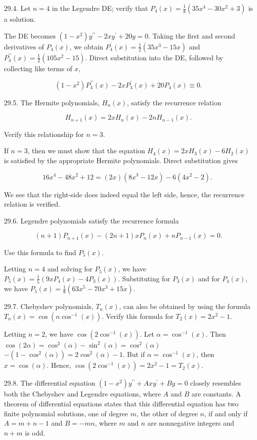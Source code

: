 \documentclass[10pt]{article}
\begin{document}
29.4. Let $n=4$ in the Legendre DE; verify that $P_{4}(x)=\frac{1}{8}\left(35 x^{4}-30 x^{2}+3\right)$ is a solution.

The DE becomes $\left(1-x^{2}\right) y^{\prime \prime}-2 x y^{\prime}+20 y=0$. Taking the first and second derivatives of $P_{4}(x)$, we obtain $P_{4}^{\prime}(x)=\frac{1}{2}\left(35 x^{3}-15 x\right)$ and $P_{4}^{\prime \prime}(x)=\frac{1}{2}\left(105 x^{2}-15\right)$. Direct substitution into the DE, followed by collecting like terms of $x$,

$$
\left(1-x^{2}\right) P_{4}^{\prime \prime}(x)-2 x P_{4}^{\prime}(x)+20 P_{4}(x) \equiv 0 .
$$

29.5. The Hermite polynomials, $H_{n}(x)$, satisfy the recurrence relation

$$
H_{n+1}(x)=2 x H_{n}(x)-2 n H_{n-1}(x) .
$$

Verify this relationship for $n=3$.

If $n=3$, then we must show that the equation $H_{4}(x)=2 x H_{3}(x)-6 H_{2}(x)$ is satisfied by the appropriate Hermite polynomials. Direct substitution gives

$$
16 x^{4}-48 x^{2}+12=(2 x)\left(8 x^{3}-12 x\right)-6\left(4 x^{2}-2\right) \text {. }
$$

We see that the right-side does indeed equal the left side, hence, the recurrence relation is verified.

29.6. Legendre polynomials satisfy the recurrence formula

$$
(n+1) P_{n+1}(x)-(2 n+1) x P_{n}(x)+n P_{n-1}(x)=0 .
$$

Use this formula to find $P_{5}(x)$.

Letting $n=4$ and solving for $P_{5}(x)$, we have $P_{5}(x)=\frac{1}{5}\left(9 x P_{4}(x)-4 P_{3}(x)\right)$. Substituting for $P_{3}(x)$ and for $P_{4}(x)$, we have $P_{5}(x)=\frac{1}{8}\left(63 x^{5}-70 x^{3}+15 x\right)$.

29.7. Chebyshev polynomials, $T_{n}(x)$, can also be obtained by using the formula $T_{n}(x)=\cos \left(n \cos ^{-1}(x)\right)$. Verify this formula for $T_{2}(x)=2 x^{2}-1$.

Letting $n=2$, we have $\cos \left(2 \cos ^{-1}(x)\right)$. Let $\alpha=\cos ^{-1}(x)$. Then $\cos (2 \alpha)=\cos ^{2}(\alpha)-\sin ^{2}(\alpha)=\cos ^{2}(\alpha)$ $-\left(1-\cos ^{2}(\alpha)\right)=2 \cos ^{2}(\alpha)-1$. But if $\alpha=\cos ^{-1}(x)$, then $x=\cos (\alpha)$. Hence, $\cos \left(2 \cos ^{-1}(x)\right)=2 x^{2}-1=T_{2}(x)$.

29.8. The differential equation $\left(1-x^{2}\right) y^{\prime \prime}+A x y^{\prime}+B y=0$ closely resembles both the Chebyshev and Legendre equations, where $A$ and $B$ are constants. A theorem of differential equations states that this differential equation has two finite polynomial solutions, one of degree $m$, the other of degree $n$, if and only if $A=m+n-1$ and $B=-m n$, where $m$ and $n$ are nonnegative integers and $n+m$ is odd.
\end{document}
